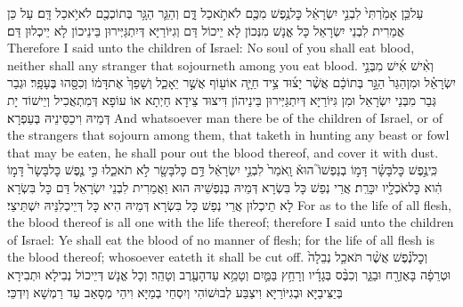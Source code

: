 {עַל\maqqaf כֵּ֤ן אָמַ֙רְתִּי֙ לִבְנֵ֣י יִשְׂרָאֵ֔ל כׇּל\maqqaf נֶ֥פֶשׁ מִכֶּ֖ם לֹא\maqqaf תֹ֣אכַל דָּ֑ם וְהַגֵּ֛ר הַגָּ֥ר בְּתוֹכְכֶ֖ם לֹא\maqqaf יֹ֥אכַל דָּֽם׃}
{עַל כֵּן אֲמַרִית לִבְנֵי יִשְׂרָאֵל כָּל אֱנָשׁ מִנְּכוֹן לָא יֵיכוֹל דַּם וְגִיּוֹרַיָּא דְּיִתְגַּיְּירוּן בֵּינֵיכוֹן לָא יֵיכְלוּן דַּם׃}
{Therefore I said unto the children of Israel: No soul of you shall eat blood, neither shall any stranger that sojourneth among you eat blood.}{}
{וְאִ֨ישׁ אִ֜ישׁ מִבְּנֵ֣י יִשְׂרָאֵ֗ל וּמִן\maqqaf הַגֵּר֙ הַגָּ֣ר בְּתוֹכָ֔ם אֲשֶׁ֨ר יָצ֜וּד צֵ֥יד חַיָּ֛ה אוֹ\maqqaf ע֖וֹף אֲשֶׁ֣ר יֵאָכֵ֑ל וְשָׁפַךְ֙ אֶת\maqqaf דָּמ֔וֹ וְכִסָּ֖הוּ בֶּעָפָֽר׃}
{וּגְבַר גְּבַר מִבְּנֵי יִשְׂרָאֵל וּמִן גִּיּוֹרַיָּא דְּיִתְגַּיְּירוּן בֵּינֵיהוֹן דִּיצוּד צֵידָא חַיְתָא אוֹ עוֹפָא דְּמִתְאֲכִיל וְיֵישׁוֹד יָת דְּמֵיהּ וִיכַסֵּינֵיהּ בְּעַפְרָא׃}
{And whatsoever man there be of the children of Israel, or of the strangers that sojourn among them, that taketh in hunting any beast or fowl that may be eaten, he shall pour out the blood thereof, and cover it with dust.}{}
{כִּֽי\maqqaf נֶ֣פֶשׁ כׇּל\maqqaf בָּשָׂ֗ר דָּמ֣וֹ בְנַפְשׁוֹ֮ הוּא֒ וָֽאֹמַר֙ לִבְנֵ֣י יִשְׂרָאֵ֔ל דַּ֥ם כׇּל\maqqaf בָּשָׂ֖ר לֹ֣א תֹאכֵ֑לוּ כִּ֣י נֶ֤פֶשׁ כׇּל\maqqaf בָּשָׂר֙ דָּמ֣וֹ הִ֔וא כׇּל\maqqaf אֹכְלָ֖יו יִכָּרֵֽת׃}
{אֲרֵי נְפַשׁ כָּל בִּשְׂרָא דְּמֵיהּ בְּנַפְשֵׁיהּ הוּא וַאֲמַרִית לִבְנֵי יִשְׂרָאֵל דַּם כָּל בִּשְׂרָא לָא תֵיכְלוּן אֲרֵי נְפַשׁ כָּל בִּשְׂרָא דְּמֵיהּ הִיא כָּל דְּיֵיכְלִנֵּיהּ יִשְׁתֵּיצֵי׃}
{For as to the life of all flesh, the blood thereof is all one with the life thereof; therefore I said unto the children of Israel: Ye shall eat the blood of no manner of flesh; for the life of all flesh is the blood thereof; whosoever eateth it shall be cut off.}{}
{וְכׇל\maqqaf נֶ֗פֶשׁ אֲשֶׁ֨ר תֹּאכַ֤ל נְבֵלָה֙ וּטְרֵפָ֔ה בָּאֶזְרָ֖ח וּבַגֵּ֑ר וְכִבֶּ֨ס בְּגָדָ֜יו וְרָחַ֥ץ בַּמַּ֛יִם וְטָמֵ֥א עַד\maqqaf הָעֶ֖רֶב וְטָהֵֽר׃}
{וְכָל אֱנָשׁ דְּיֵיכוֹל נְבִילָא וּתְבִירָא בְּיַצִּיבַיָּא וּבְגִיּוֹרַיָּא וִיצַבַּע לְבוּשׁוֹהִי וְיִסְחֵי בְמַיָּא וִיהֵי מְסָאַב עַד רַמְשָׁא וְיִדְכֵּי׃}
